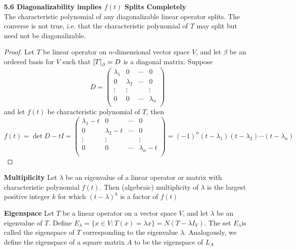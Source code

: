 \documentclass[11pt]{article}
\begin{document}
\begin{theorem*}
    \textbf{5.6 Diagonalizability implies $f(t)$ Splits Completely}  \\
    The characteristic polynomial of any diagonalizable linear operator splits. The converse is not true, i.e. that the characteristic polynomial of $T$ may split but need not be diagonalizable. 
    \begin{proof}
        Let $T$ be linear operator on $n$-dimensional vector space $V$, and let $\beta$ be an ordered basis for $V$ such that $\left[ T \right]_{\beta} = D$ is a diagonal matrix. Suppose 
        \[
            D = 
            \begin{pmatrix}
                \lambda_1 & 0 & \cdots & 0 \\
                0 & \lambda_2 & \cdots & 0 \\
                \vdots & \vdots & & \vdots \\ 
                0 & 0 & \cdots & \lambda_n \\
            \end{pmatrix}    
        \]
        and let $f(t)$ be characteristic polynomial of $T$, then 
        \[
            f(t) = \det{D-tI} = 
            \begin{pmatrix}
                \lambda_1 -t& 0 & \cdots & 0 \\
                0 & \lambda_2-t & \cdots & 0 \\
                \vdots & \vdots & & \vdots \\ 
                0 & 0 & \cdots & \lambda_n-t \\
            \end{pmatrix}        
            = (-1)^n (t-\lambda_1)(t-\lambda_2)\cdots (t-\lambda_n)     
        \]
    \end{proof}
\end{theorem*}

\begin{defn*}
    \textbf{Multiplicity} Let $\lambda$ be an eigenvalue of a linear operator or matrix with characteristic polynomial $f(t)$. Then (algebraic) multiplicity of $\lambda$ is the largest positive integer $k$ for which $(t-\lambda)^k$ is a factor of $f(t)$
\end{defn*}


\begin{defn*}
    \textbf{Eigenspace} Let $T$ be a linear operator on a vector space $V$, and let $\lambda$ be an eigenvalue of $T$. Define $E_{\lambda} = \{x\in V: T(x) = \lambda x \} = N(T-\lambda I_V)$. The set $E_{\lambda}$is called the eigenspace of $T$ corresponding to the eigenvalue $\lambda$. Analogously, we define the eigenspace of a square matrix $A$ to be the eigenspace of $L_A$
\end{defn*}
\end{document}
